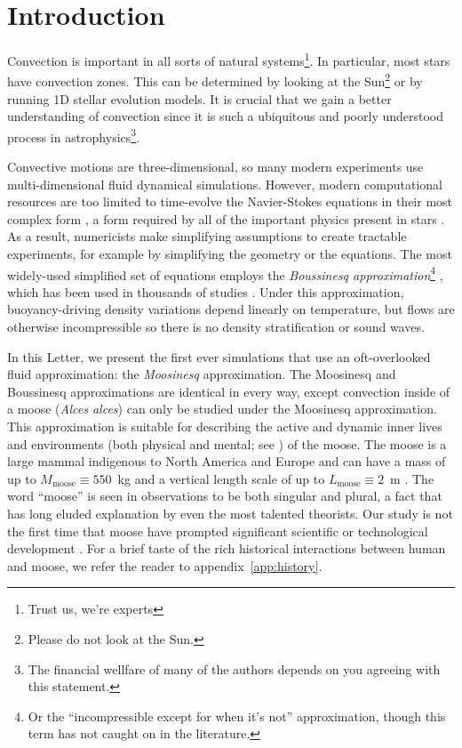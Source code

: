 \section{Introduction}
\label{sec:introduction}

Convection is important in all sorts of natural systems\footnote{Trust us, we're experts}.
In particular, most stars have convection zones.
This can be determined by looking at the Sun\footnote{Please do not look at the Sun.} or by running 1D stellar evolution models.
It is crucial that we gain a better understanding of convection since it is such a ubiquitous and poorly understood process in astrophysics\footnote{The financial wellfare of many of the authors depends on you agreeing with this statement.}.

Convective motions are three-dimensional, so many modern experiments use multi-dimensional fluid dynamical simulations.
However, modern computational resources are too limited to time-evolve the Navier-Stokes equations in their most complex form \citep{landau}, a form required by all of the important physics present in stars \citep{Paxton2011, Paxton2013, Paxton2015, Paxton2018, Paxton2019}.
As a result, numericists make simplifying assumptions to create tractable experiments, for example by simplifying the geometry or the equations.
The most widely-used simplified set of equations employs the \emph{Boussinesq approximation}\footnote{Or the ``incompressible except for when it's not'' approximation, though this term has not caught on in the literature.} \citep{spiegel_veronis_1960}, which has been used in thousands of studies \citep[see e.g.,][]{ahlers_etal_2009}.
Under this approximation, buoyancy-driving density variations depend linearly on temperature, but flows are otherwise incompressible so there is no density stratification or sound waves.

In this Letter, we present the first ever simulations that use an oft-overlooked fluid approximation: the \emph{Moosinesq} approximation.
The Moosinesq and Boussinesq approximations are identical in every way, except convection inside of a moose (\emph{Alces alces}) can only be studied under the Moosinesq approximation.
This approximation is suitable for describing the active and dynamic inner lives and environments (both physical and mental; see \citealp{Gibson2015}) of the moose.
The moose is a large mammal indigenous to North America and Europe and can have a mass of up to $M_\mathrm{moose}\equiv 550$~kg and a vertical length scale of up to $L_\mathrm{moose} \equiv 2$~m \citep{CPWmoose}.
The word ``moose'' is seen in observations to be both singular and plural, a fact that has long eluded explanation by even the most talented theorists.
Our study is not the first time that moose have prompted significant scientific or technological development \citep[see, e.g.,][]{Handel2009}.
For a brief taste of the rich historical interactions between human and moose, we refer the reader to appendix~\ref{app:history}.


